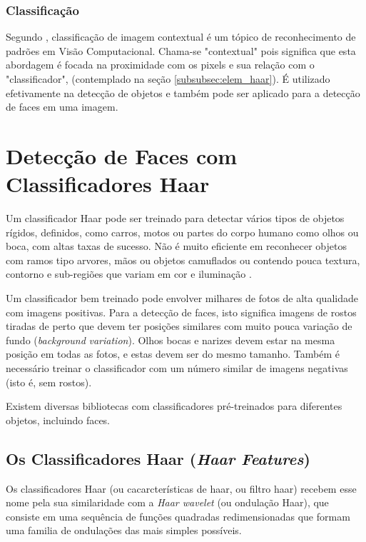 \subsubsection{Classificação}\label{subsubsec:classificacao}

Segundo \cite{edinburgh_classifier}, classificação de imagem contextual é um tópico de reconhecimento de padrões em  Visão Computacional. Chama-se "contextual" pois significa que esta abordagem é focada na proximidade com os pixels e sua relação com o "classificador", (contemplado na seção \autoref{subsubsec:elem_haar}). É utilizado efetivamente na detecção de objetos e também pode ser aplicado para a detecção de faces em uma imagem.




\section{Detecção de Faces com Classificadores Haar}\label{sec:deteccao}

Um classificador Haar pode ser treinado para detectar vários tipos de objetos rígidos, definidos, como carros, motos ou partes do corpo humano como olhos ou boca, com altas taxas de sucesso. Não é muito eficiente em reconhecer objetos com ramos tipo arvores, mãos ou objetos camuflados ou contendo pouca textura, contorno e sub-regiões que variam em cor e iluminação \cite{drmathew_java_programming}.

Um classificador bem treinado pode envolver milhares de fotos de alta qualidade com imagens positivas. Para a detecção de faces, isto significa imagens de rostos tiradas de perto que devem ter posições similares com muito pouca variação de fundo (\textit{background} \textit{variation}). Olhos bocas e narizes devem estar na mesma posição em todas as fotos, e estas devem ser do mesmo tamanho. Também é necessário treinar o classificador com um número similar de imagens negativas (isto é, sem rostos).

Existem diversas bibliotecas com classificadores pré-treinados para diferentes objetos, incluindo faces.


\subsection{Os Classificadores Haar (\textit{Haar Features}) }\label{subsubsec:elem_haar}

Os classificadores Haar (ou cacarcterísticas de haar, ou filtro haar) recebem esse nome pela sua similaridade com a \textit{Haar wavelet} (ou ondulação Haar), que consiste em uma sequência de funções quadradas redimensionadas que formam uma familia de ondulações das mais simples possíveis.

